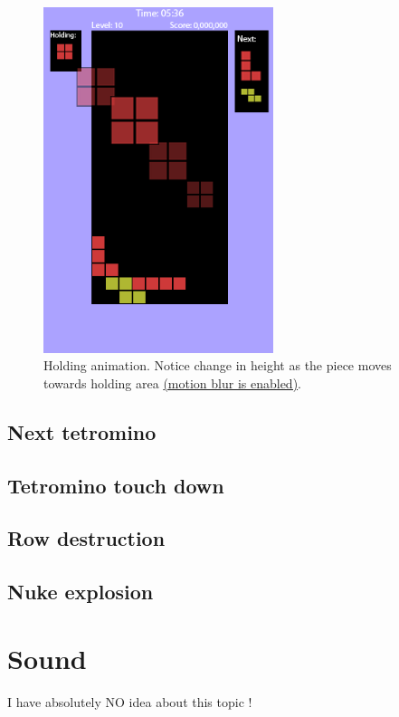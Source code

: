 \documentclass[10pt]{report}
\theoremstyle{definition}
\theoremstyle{remark}
\begin{document}
\begin{figure}
\label{fig:holding}
  \centering
    \includegraphics[width=0.6\textwidth]{holding}
    \caption[Holding Animation]{Holding animation. Notice change in height as the piece moves towards holding area \underline{(motion blur is enabled)}.}
\end{figure}

\section{Next tetromino}

\section{Tetromino touch down}

\section{Row destruction}

\section{Nuke explosion}

\chapter{Sound}
I have absolutely NO idea about this topic !
\end{document}
